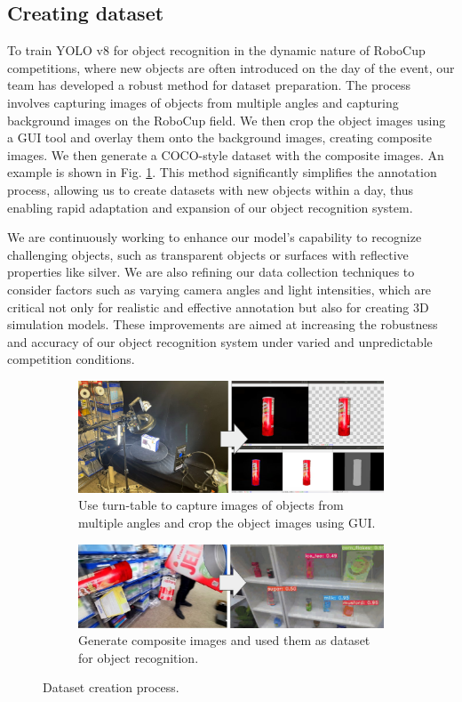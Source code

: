 \documentclass[runningheads,a4paper]{llncs}
\begin{document}
\subsection{Creating dataset}
To train YOLO v8 for object recognition in the dynamic nature of RoboCup competitions, where new objects are often introduced on the day of the event, our team has developed a robust method for dataset preparation.
The process involves capturing images of objects from multiple angles and capturing background images on the RoboCup field.
We then crop the object images using a GUI tool and overlay them onto the background images, creating composite images.
We then generate a COCO-style dataset with the composite images.
An example is shown in Fig. \ref{fig:dataset}.
This method significantly simplifies the annotation process, allowing us to create datasets with new objects within a day, thus enabling rapid adaptation and expansion of our object recognition system.

We are continuously working to enhance our model’s capability to recognize challenging objects, such as transparent objects or surfaces with reflective properties like silver.
We are also refining our data collection techniques to consider factors such as varying camera angles and light intensities, which are critical not only for realistic and effective annotation but also for creating 3D simulation models.
These improvements are aimed at increasing the robustness and accuracy of our object recognition system under varied and unpredictable competition conditions.

\begin{figure}[tbp]
	\centering
	\begin{subfigure}[b]{0.8\linewidth}
		\includegraphics[width=1.0\linewidth]{images/dataset1.png}
		\caption{Use turn-table to capture images of objects from multiple angles and crop the object images using GUI.}
	\end{subfigure}
	\vfill
	\begin{subfigure}[b]{0.8\linewidth}
		\includegraphics[width=1.0\linewidth]{images/dataset2.png}
		\caption{Generate composite images and used them as dataset for object recognition.}
	\end{subfigure}
	\caption{Dataset creation process.}
	\label{fig:dataset}
\end{figure}
\end{document}
